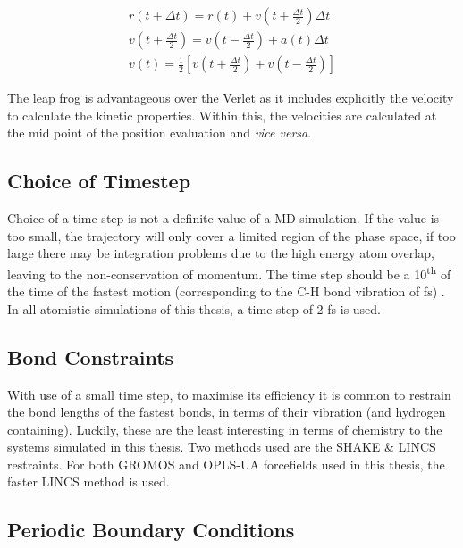 \begin{equation} \label{eq:leapfrog}
\begin{align*}
r(t + \Delta t) = r(t) + v (t + \frac{\Delta t}{2}) \Delta t \\
v(t + \frac{\Delta t}{2}) = v(t - \frac{\Delta t}{2}) + a(t)\Delta t \\
v(t) = \frac{1}{2}\left[ v(t + \frac{\Delta t}{2}) + v(t - \frac{\Delta t}{2}) \right]
\end{align*}
\end{equation}

The leap frog is advantageous over the Verlet as it includes explicitly the velocity to calculate the kinetic properties.  Within this, the velocities are calculated at the mid point of the position evaluation and \textit{vice versa}. 


\subsection{Choice of Timestep}

Choice of a time step is not a definite value of a MD simulation. If the value is too small, the trajectory will only cover a limited region of the phase space, if too large there may be integration problems due to the high energy atom overlap, leaving to the non-conservation of momentum. The time step should be a 10\textsuperscript{th} of the time of the fastest motion (corresponding to the C-H bond vibration of  fs) \cite{Leach2001}. In all atomistic simulations of this thesis, a time step of 2 fs is used. 

\subsection{Bond Constraints}

With use of a small time step, to maximise its efficiency it is common to restrain the bond lengths of the fastest bonds, in terms of their vibration (and hydrogen containing). Luckily, these are the least interesting in terms of chemistry to the systems simulated in this thesis. Two methods used are the SHAKE \cite{Ryckaert1977} \& LINCS \cite{Hess1997a} restraints. For both GROMOS and OPLS-UA forcefields used in this thesis, the faster LINCS method is used. 

\subsection{Periodic Boundary Conditions} 

